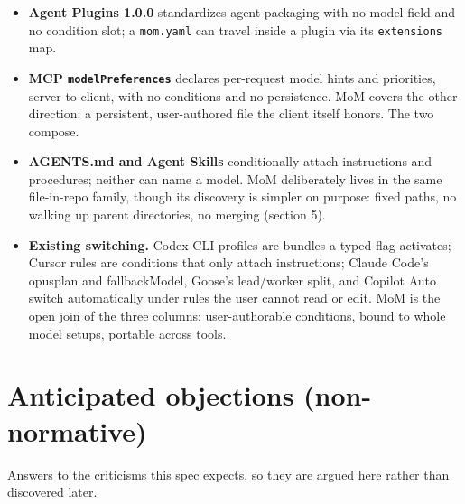 \documentclass[11pt]{article}
\newcommand{\key}[1]{\texttt{#1}}
\begin{document}
\begin{itemize}
  \item \textbf{Agent Plugins 1.0.0} standardizes agent packaging with no
        model field and no condition slot; a \key{mom.yaml} can travel
        inside a plugin via its \key{extensions} map.
  \item \textbf{MCP \key{modelPreferences}} declares per-request model hints
        and priorities, server to client, with no conditions and no
        persistence. MoM covers the other direction: a persistent,
        user-authored file the client itself honors. The two compose.
  \item \textbf{AGENTS.md and Agent Skills} conditionally attach
        instructions and procedures; neither can name a model. MoM
        deliberately lives in the same file-in-repo family, though its
        discovery is simpler on purpose: fixed paths, no walking up parent
        directories, no merging (section 5).
  \item \textbf{Existing switching.} Codex CLI profiles are bundles a typed
        flag activates; Cursor rules are conditions that only attach
        instructions; Claude Code's opusplan and fallbackModel, Goose's
        lead/worker split, and Copilot Auto switch automatically under rules
        the user cannot read or edit. MoM is the open join of the three
        columns: user-authorable conditions, bound to whole model setups,
        portable across tools.
\end{itemize}

\section{Anticipated objections (non-normative)}

Answers to the criticisms this spec expects, so they are argued here
rather than discovered later.
\end{document}
